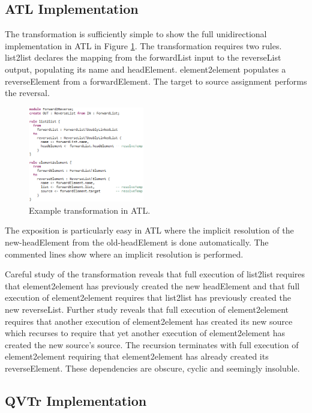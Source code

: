 \documentclass[conference]{IEEEtran}
\begin{document}
\subsection{ATL Implementation}

The transformation is sufficiently simple to show the full unidirectional implementation in ATL in Figure \ref{fig:Forward2Reverse-ATL}. The transformation requires two rules. list2list declares the mapping from the forwardList input to the reverseList output, populating its name and headElement. element2element populates a reverseElement from a forwardElement. The target to source assignment performs the reversal.

\begin{figure}[h]
	\centering
	\includegraphics[width=0.45\textwidth]{Forward2Reverse-ATL.png}
	\caption{Example transformation in ATL.}
	\label{fig:Forward2Reverse-ATL}
\end{figure}

The exposition is particularly easy in ATL where the implicit resolution of the new-headElement from the old-headElement is done automatically. The commented lines show where an implicit resolution is performed.

Careful study of the transformation reveals that full execution of list2list requires that element2element has previously created the new headElement and that full execution of element2element requires that list2list has previously created the new reverseList. Further study reveals that full execution of element2element requires that another execution of element2element has created its new source which recurses to require that yet another execution of element2element has created the new source's source. The recursion terminates with full execution of element2element requiring that element2element has already created its reverseElement. These dependencies are obscure, cyclic and seemingly insoluble.

\subsection{QVTr Implementation}
\end{document}
